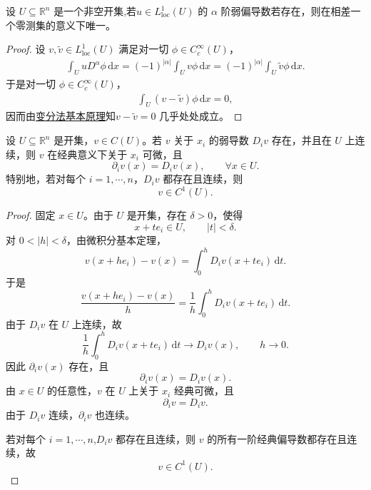 \documentclass[../../main.tex]{subfiles}
\begin{document}
\begin{lemma}[弱导数的唯一性]\label{lemma:ch05-弱导数唯一性}
设 $U \subseteq \mathbb{R}^n$ 是一个非空开集,若$u\in L_{\mathrm{loc}}^1(U)$ 的 $\alpha$ 阶弱偏导数若存在，则在相差一个零测集的意义下唯一。
\end{lemma}
\begin{proof}
设 $v,\widetilde{v}\in L^{1}_{\mathrm{loc}}(U)$ 满足对一切 $\phi\in C^{\infty}_{c}(U)$，
\begin{align*}
\int_{U}uD^{\alpha}\phi\,\mathrm{d}x=(-1)^{|\alpha|}\int_{U}v\phi\,\mathrm{d}x=(-1)^{|\alpha|}\int_{U}\widetilde{v}\phi\,\mathrm{d}x.
\end{align*}
于是对一切 $\phi\in C^{\infty}_{c}(U)$，
\begin{align*}
\int_{U}(v-\widetilde{v})\phi\,\mathrm{d}x=0,
\end{align*}
因而由\hyperref[lemma:变分法基本原理]{变分法基本原理}知$v-\widetilde{v}=0$ 几乎处处成立。
\end{proof}

\begin{proposition}[连续弱导数就是经典导数]
\label{proposition:ch05-连续弱导数}
设 \(U\subseteq\mathbb R^n\) 是开集，\(v\in C(U)\)。若 \(v\) 关于 \(x_i\) 的弱导数 \(D_i v\) 存在，并且在 \(U\) 上连续，则 \(v\) 在经典意义下关于 \(x_i\) 可微，且
\[
\partial_i v(x)=D_i v(x),
\qquad
\forall x\in U.
\]
特别地，若对每个 \(i=1,\cdots,n\)，\(D_i v\) 都存在且连续，则
\[
v\in C^1(U).
\]
\end{proposition}
\begin{proof}
固定 \(x\in U\)。由于 \(U\) 是开集，存在 \(\delta>0\)，使得
\[
x+te_i\in U,
\qquad
|t|<\delta.
\]
对 \(0<|h|<\delta\)，由微积分基本定理，
\[
v(x+he_i)-v(x)
=
\int_0^h
D_i v(x+te_i)\,\mathrm{d}t.
\]
于是
\[
\frac{v(x+he_i)-v(x)}{h}
=
\frac1h
\int_0^h
D_i v(x+te_i)\,\mathrm{d}t.
\]
由于 \(D_i v\) 在 \(U\) 上连续，故
\[
\frac1h
\int_0^h
D_i v(x+te_i)\,\mathrm{d}t
\longrightarrow
D_i v(x),
\qquad
h\to0.
\]
因此 \(\partial_i v(x)\) 存在，且
\[
\partial_i v(x)=D_i v(x).
\]
由 \(x\in U\) 的任意性，\(v\) 在 \(U\) 上关于 \(x_i\) 经典可微，且
\[
\partial_i v=D_i v.
\]
由于 \(D_i v\) 连续，\(\partial_i v\) 也连续。

若对每个 \(i=1,\cdots,n\),\(D_i v\) 都存在且连续，则 \(v\) 的所有一阶经典偏导数都存在且连续，故
\[
v\in C^1(U).
\]
\end{proof}
\end{document}
